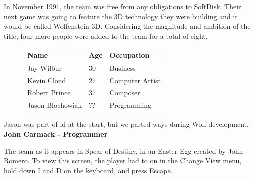 \documentclass[book.tex]{subfiles}
\begin{document}
In November 1991, the team was free from any obligations to SoftDisk. Their next game was going to feature the 3D technology they were building and it would be called Wolfenstein 3D. Considering the magnitude and ambition of the title, four more people were added to the team for a total of eight.\\
 \begin{figure}[H]
\centering  
\begin{tabularx}{\textwidth}{ X  X  X  }
  \toprule
  \textbf{Name} &  \textbf{Age} & \textbf{Occupation} \\
  \toprule 
   Jay Wilbur & 30 &  Business\\
   Kevin Cloud\protect\footnotemark & 27 &  Computer Artist\\
   Robert Prince\protect\footnotemark & 37 &  Composer\\
   Jason Blochowiak\protect\footnotemark & ?? &   Programming\\
     \toprule
\end{tabularx}
\label{fig:Id Software hires}
\end{figure}
\addtocounter{footnote}{-2}

\begin{fancyquotes}
Jason was part of id at the start, but we parted ways during Wolf development.
 \bigskip \\
\textbf{John Carmack - Programmer}
 \end{fancyquotes}


 
\begin{figure}[H]
\centering
  
    

\label{fig:id_team_1993}
\end{figure}
\par
The team as it appears in Spear of Destiny, in an Easter Egg created by John Romero. To view this screen, the player had to on in the Change View menu, hold down I and D on the keyboard, and press Escape.
\end{document}
